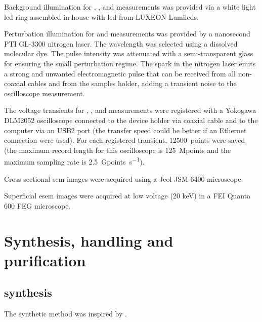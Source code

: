 	 Background illumination for , , and  measurements was provided via a white light \gls{led} ring assembled in-house with \gls{led} from LUXEON Lumileds.

	 Perturbation illumination for  and  measurements was provided by a nanosecond PTI GL-3300 nitrogen laser. The wavelength was selected using a dissolved molecular dye. The pulse intensity was attenuated with a semi-transparent glass for ensuring the small perturbation regime. The spark in the nitrogen laser emits a strong and unwanted electromagnetic pulse that can be received from all non-coaxial cables and from the samples holder, adding a transient noise to the oscilloscope measurement.

	 The voltage transients for , , and  measurements were registered with a Yokogawa DLM2052 oscilloscope connected to the device holder via coaxial cable and to the computer via an USB2 port (the transfer speed could be better if an Ethernet connection were used). For each registered transient, \SI{12500}{points} were saved (the maximum record length for this oscilloscope is \SI{125}{Mpoints} and the maximum sampling rate is \SI{2.5}{Gpoints\per\s}).

	 Cross sectional \gls{sem} images were acquired using a Jeol JSM-6400 microscope.

	 Superficial \gls{esem} images were acquired at low voltage (20 keV) in a FEI Quanta 600 FEG microscope.


\section{Synthesis, handling and purification}

	\subsection{ synthesis}\label{methods-MAI}


		The synthetic method was inspired by \cite{Im2011a, Aharon2014, Williams2014, Etgar2012a, Nagaoka2015}.

